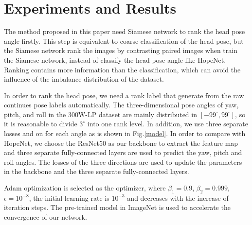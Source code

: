 \documentclass[english]{DDCLSconf}
\begin{document}
\section{Experiments and Results}
The method proposed in this paper need Siamese network to rank the head pose angle firstly. This step is equivalent to coarse classification of the head pose, but the Siamese network rank the images by contrasting paired images when train the Siamese network, instead of classify the head pose angle like HopeNet. Ranking contains more information than the classification, which can avoid the influence of the imbalance distribution of the dataset.

In order to rank the head pose, we need a rank label that generate from the raw continues pose labels automatically. The three-dimensional pose angles of yaw, pitch, and roll in the 300W-LP dataset are mainly distributed in $[-99^{\circ}, 99^{\circ}]$, so it is reasonable to divide $3^{\circ}$ into  one rank level. In addition, we use three separate losses and on for each angle as is shown in Fig.\ref{model}. In order to compare with HopeNet, we choose the ResNet50 as our backbone to extract the feature map and three separate fully-connected layers are used to predict the yaw, pitch and roll angles. The losses of the three directions are used to update the parameters in the backbone and the three separate fully-connected layers.

Adam optimization is selected as the optimizer, where $\beta _1=0.9$, $\beta _2=0.999$, $\epsilon =10^{-8}$, the initial learning rate is $10^{-3}$ and decreases with the increase of iteration steps. The pre-trained model in ImageNet is used to accelerate the convergence of our network. 
\end{document}
